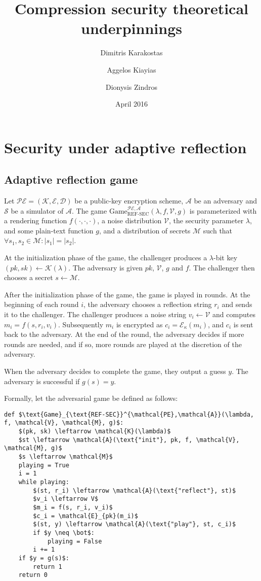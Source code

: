\documentclass{article}
\title{Compression security theoretical underpinnings}
\author{
Dimitris Karakostas
\and
Aggelos Kiayias
\and
Dionysis Zindros
}
\date{April 2016}
\begin{document}
\maketitle

\section*{Security under adaptive reflection}

\subsection*{Adaptive reflection game}

Let $\mathcal{PE} = (\mathcal{K}, \mathcal{E}, \mathcal{D})$ be a public-key
encryption scheme, $\mathcal{A}$ be an adversary and $\mathcal{S}$ be a
simulator of $\mathcal{A}$.  The game
$\text{Game}_{\text{REF-SEC}}^{\mathcal{PE},\mathcal{A}}(\lambda,  f,
\mathcal{V}, g)$ is parameterized with a rendering function $f(\cdot, \cdot,
\cdot)$, a noise distribution $\mathcal{V}$, the security parameter $\lambda$,
and some plain-text function $g$, and a distribution of secrets $\mathcal{M}$
such that $\forall s_1, s_2 \in \mathcal{M}: |s_1| = |s_2|$.

At the initialization phase of the game, the challenger produces a
$\lambda$-bit key $(pk, sk) \leftarrow \mathcal{K}(\lambda)$. The adversary is
given $pk$, $\mathcal{V}$, $g$ and $f$.  The challenger then chooses a secret
$s \leftarrow \mathcal{M}$.

After the initialization phase of the game, the game is played in rounds. At
the beginning of each round $i$, the adversary chooses a reflection string
$r_i$ and sends it to the challenger. The challenger produces a noise string
$v_i \leftarrow \mathcal{V}$ and computes $m_i = f(s, r_i, v_i)$.  Subsequently
$m_i$ is encrypted as $c_i = \mathcal{E}_\kappa(m_i)$, and $c_i$ is sent back
to the adversary. At the end of the round, the adversary  decides if more
rounds are needed, and if so, more rounds are played at the discretion of the
adversary.

When the adversary decides to complete the game, they output a guess $y$. The
adversary is successful if $g(s) = y$.

Formally, let the adversarial game be defined as follows:

\begin{lstlisting}[texcl,mathescape]
def $\text{Game}_{\text{REF-SEC}}^{\mathcal{PE},\mathcal{A}}(\lambda, f, \mathcal{V}, \mathcal{M}, g)$:
    $(pk, sk) \leftarrow \mathcal{K}(\lambda)$
    $st \leftarrow \mathcal{A}(\text{"init"}, pk, f, \mathcal{V}, \mathcal{M}, g)$
    $s \leftarrow \mathcal{M}$
    playing = True
    i = 1
    while playing:
        $(st, r_i) \leftarrow \mathcal{A}(\text{"reflect"}, st)$
        $v_i \leftarrow V$
        $m_i = f(s, r_i, v_i)$
        $c_i = \mathcal{E}_{pk}(m_i)$
        $(st, y) \leftarrow \mathcal{A}(\text{"play"}, st, c_i)$
        if $y \neq \bot$:
            playing = False
        i += 1
    if $y = g(s)$:
        return 1
    return 0
\end{lstlisting}
\end{document}
